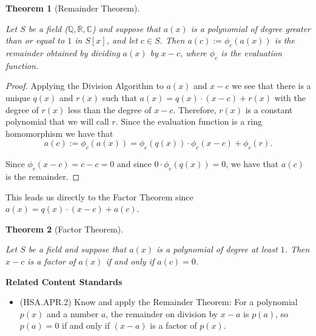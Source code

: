 \documentclass[
]{book}
\providecommand{\tightlist}{%
  \setlength{\itemsep}{0pt}\setlength{\parskip}{0pt}}
\newenvironment{standards}{}{}
\newtheorem{theorem}{Theorem}[chapter]
\theoremstyle{definition}
\theoremstyle{definition}
\theoremstyle{definition}
\theoremstyle{definition}
\theoremstyle{remark}
\begin{document}
\begin{theorem}[Remainder Theorem]
\protect\hypertarget{thm:unlabeled-div-122}{}\label{thm:unlabeled-div-122}

Let \(S\) be a field (\(\mathbb{Q}, \mathbb{R}, \mathbb{C}\)) and suppose that \(a(x)\) is a polynomial of degree greater than or equal to \(1\) in \(S[x]\), and let \(c\in S\). Then \(a(c):=\phi_c(a(x))\) is the remainder obtained by dividing \(a(x)\) by \(x-c\), where \(\phi_c\) is the evaluation function.

\end{theorem}

\begin{proof}

Applying the Division Algorithm to \(a(x)\) and \(x-c\) we see that there is a unique \(q(x)\) and \(r(x)\) such that \(a(x)=q(x)\cdot (x-c)+r(x)\) with the degree of \(r(x)\) less than the degree of \(x-c\). Therefore, \(r(x)\) is a constant polynomial that we will call \(r\). Since the evaluation function is a ring homomorphism we have that \[a(c):= \phi_c(a(x))=\phi_c(q(x))\cdot \phi_c(x-c) + \phi_c(r).\]

Since \(\phi_c(x-c)=c-c=0\) and since \(0\cdot \phi_c(q(x))=0\), we have that \(a(c)\) is the remainder.

\end{proof}

This leads us directly to the Factor Theorem since \(a(x)=q(x)\cdot (x-c) + a(c)\).

\begin{theorem}[Factor Theorem]
\protect\hypertarget{thm:unlabeled-div-124}{}\label{thm:unlabeled-div-124}

Let \(S\) be a field and suppose that \(a(x)\) is a polynomial of degree at least \(1\). Then \(x-c\) is a factor of \(a(x)\) if and only if \(a(c)=0\).

\end{theorem}

\begin{standards}

\begin{center}
\textbf{Related Content Standards}

\end{center}

\begin{itemize}
\tightlist
\item
  (HSA.APR.2) Know and apply the Remainder Theorem: For a polynomial \(p(x)\) and a number \(a\), the remainder on division by \(x-a\) is \(p(a)\), so \(p(a)=0\) if and only if \((x-a)\) is a factor of \(p(x)\).\\
\end{itemize}

\end{standards}
\end{document}
